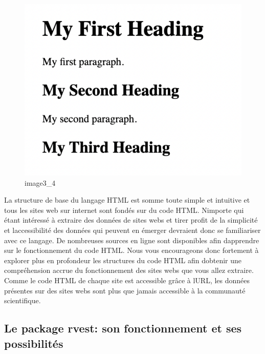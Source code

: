 \documentclass[
  letterpaper,
  DIV=11,
  numbers=noendperiod]{scrreprt}
\begin{document}
\begin{figure}[H]

{\centering \includegraphics{images/chapitre5_html_output.png}

}

\caption{image3\_4}

\end{figure}%

La structure de base du langage HTML est somme toute simple et intuitive
et tous les sites web sur internet sont fondés sur du code HTML.
N\textquotesingle importe qui étant intéressé à extraire des données de
sites webs et tirer profit de la simplicité et
l\textquotesingle accessibilité des données qui peuvent en émerger
devraient donc se familiariser avec ce langage. De nombreuses sources en
ligne sont disponibles afin d\textquotesingle apprendre sur le
fonctionnement du code HTML. Nous vous encourageons donc fortement à
explorer plus en profondeur les structures du code HTML afin
d\textquotesingle obtenir une compréhension accrue du fonctionnement des
sites webs que vous allez extraire. Comme le code HTML de chaque site
est accessible grâce à l\textquotesingle URL, les données présentes sur
des sites webs sont plus que jamais accessible à la communauté
scientifique.

\subsection{\texorpdfstring{\textbf{Le package rvest: son fonctionnement
et ses
possibilités}}{Le package rvest: son fonctionnement et ses possibilités}}\label{le-package-rvest-son-fonctionnement-et-ses-possibilituxe9s}
\end{document}
